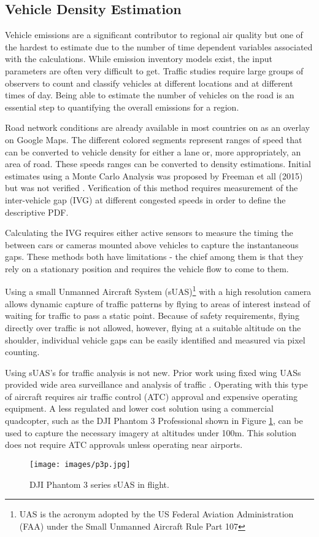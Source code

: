\subsection{Vehicle Density Estimation}

Vehicle emissions are a significant contributor to regional air quality but one of the hardest to estimate due to the number of time dependent variables associated with the calculations. While emission inventory models exist, the input parameters are often very difficult to get. Traffic studies require large groups of observers to count and classify vehicles at different locations and at different times of day. Being able to estimate the number of vehicles on the road is an essential step to quantifying the overall emissions for a region.

Road network conditions are already available in most countries on as an overlay on Google Maps. The different colored segments represent ranges of speed that can be converted to vehicle density for either a lane or, more appropriately, an area of road. These speeds ranges can be converted to density estimations. Initial estimates using a Monte Carlo Analysis was proposed by Freeman et all (2015) but was not verified \cite{Freeman2015a}. Verification of this method requires measurement of the inter-vehicle gap (IVG) at different congested speeds in order to define the descriptive PDF. 

Calculating the IVG requires either active sensors to measure the timing the between cars or cameras mounted above vehicles to capture the instantaneous gaps. These methods both have limitations - the chief among them is that they rely on a stationary position and requires the vehicle flow to come to them. 

Using a small Unmanned Aircraft System (sUAS)\footnote{UAS is the acronym adopted by the US Federal Aviation Administration (FAA) under the Small Unmanned Aircraft Rule Part 107} with a high resolution camera allows dynamic capture of traffic patterns by flying to areas of interest instead of waiting for  traffic to pass a static point. Because of safety requirements, flying directly over traffic is not allowed, however, flying at a suitable altitude on the shoulder, individual vehicle gaps can be easily identified and measured via pixel counting. 

Using sUAS's for traffic analysis is not new. Prior work using fixed wing UASs provided wide area surveillance and analysis of traffic \cite{Coifman2006}. Operating with this type of aircraft requires air traffic control (ATC) approval and expensive operating equipment. A less regulated and lower cost solution using a commercial quadcopter, such as the DJI Phantom 3 Professional shown in Figure \ref{fig:p3p}, can be used to capture the necessary imagery at altitudes under 100m. This solution does not require ATC approvals unless operating near airports.
%
\begin{figure}
\centering
\texttt{[image: images/p3p.jpg]}  %
\caption[Small unmanned aircraft system in flight]{DJI Phantom 3 series sUAS in flight.}
\label{fig:p3p}
\end{figure}
%
